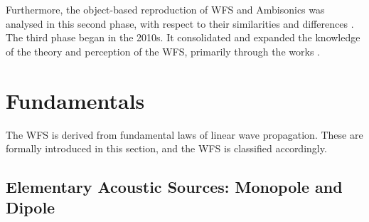 Furthermore, the object-based reproduction of WFS and Ambisonics was analysed
in this second phase, with respect to their similarities and differences
\cite{Nicol1999,Daniel2003,Gauthier2006_JASA,Spors2008b,Ahrens2010_IEEE,Fazi2010}.
%
The third phase began in the 2010s.
It consolidated and expanded the knowledge of
the theory and perception of the WFS, primarily through the works
\cite{Spors2010a,Voelk2012,Zotter2013,Rohr2013_JAES,Wierstorf2014_diss,
Firtha2019_diss,Winter2019_diss,Erbes2020_diss,ZotterSchultz2020_White,
Hahn2022_JAES}.



\section{Fundamentals}
\label{sec:WFSFundamentals}

The WFS is derived from fundamental laws of linear wave propagation.
%
These are formally introduced in this section, and the WFS is classified
accordingly.



\subsection{Elementary Acoustic Sources: Monopole and Dipole}

